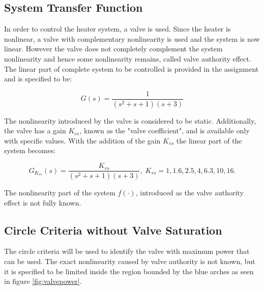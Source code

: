 \documentclass[a4paper, titlepage]{article}
\begin{document}
\subsection{System Transfer Function}
In order to control the heater system, a valve is used.
Since the heater is nonlinear, a valve with complementary nonlinearity is used and the system is now linear.
However the valve does not completely complement the system nonlinearity and hence some nonlinearity remains, called valve authority effect.
The linear part of complete system to be controlled is provided in the assignment and is specified to be:

\begin{equation}
	G(s) = \frac{1}{(s^2+s+1)(s+3)}
	\label{equ:system}
\end{equation}

The nonlinearity introduced by the valve is considered to be static.  Additionally, the valve has a gain $K_{vs}$, known as the "valve coefficient", and is available only with specific values.
With the addition of the gain $K_{vs}$ the linear part of the system becomes:

\begin{equation}
	G_{K_{vs}}(s) = \frac{K_{vs}}{(s^2+s+1)(s+3)}, \; K_{vs}=1, 1.6, 2.5, 4, 6.3, 10, 16.
	\label{equ:systemTF}
\end{equation}

The nonlinearity part of the system $f(\cdot)$, introduced as the valve authority effect is not fully known.

\subsection{Circle Criteria without Valve Saturation}

The circle criteria will be used to identify the valve with maximum power that can be used.  The exact nonlinearity caused by valve authority is not known, but it is specified to be limited inside the region bounded by the blue arches as seen in figure \ref{fig:valvepower}.
\end{document}
